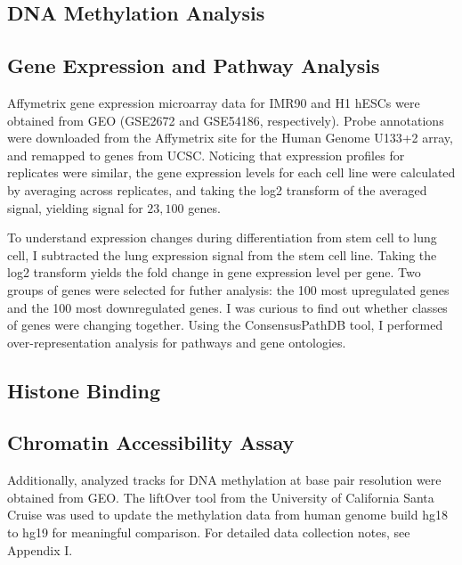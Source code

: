 \documentclass[phd,tocprelim]{cornell}
\begin{document}
\subsection{DNA Methylation Analysis}


\subsection{Gene Expression and Pathway Analysis}

Affymetrix gene expression microarray data for IMR90 and H1 hESCs were obtained from GEO (GSE2672\cite{kim2005}
and GSE54186\cite{kim2014}, respectively).  Probe annotations were downloaded from the Affymetrix site for
the Human Genome U133+2 array, and remapped to genes from UCSC.  Noticing that expression profiles for replicates
were similar, the gene expression levels for each cell line were calculated by averaging across replicates, and
taking the log2 transform of the averaged signal, yielding signal for $23,100$ genes.


To understand expression changes during differentiation from stem cell to lung cell, I subtracted the lung expression
signal from the stem cell line.  Taking the log2 transform yields the fold change in gene expression level per gene.
Two groups of genes were selected for futher analysis: the 100 most upregulated genes and the 100 most downregulated
genes.  I was curious to find out whether classes of genes were changing together.  Using the ConsensusPathDB
tool\cite{kamburov2013}, I performed over-representation analysis for pathways and gene ontologies.

\subsection{Histone Binding}


\subsection{Chromatin Accessibility Assay}


Additionally, analyzed tracks for DNA methylation at base pair
resolution were obtained from GEO\cite{lister2009}.  The liftOver tool from
the University of California Santa Cruise was used to update the methylation
data from human genome build hg18 to hg19 for meaningful comparison\cite{hinrichs2006}.
For detailed data collection notes, see Appendix I.
\end{document}
